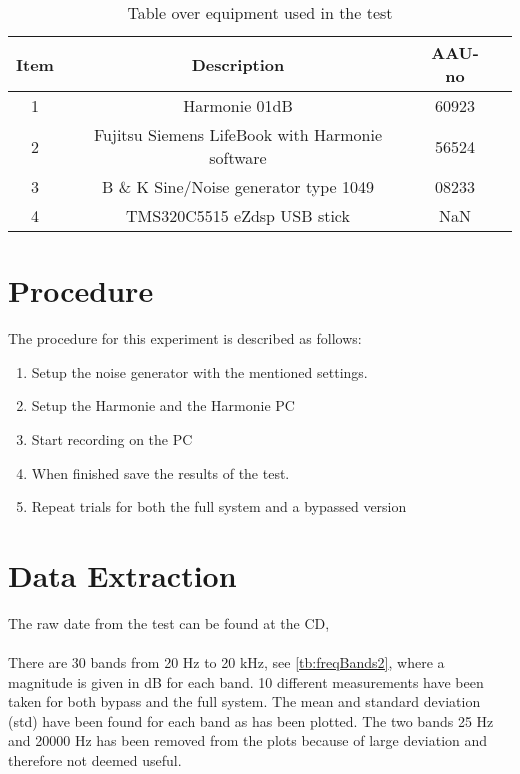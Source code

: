 \begin{table}[H]
\centering
{}
\begin{tabular}{S[table-format=1]ccc} \toprule
    {Item} & {Description} & {AAU-no} \\       &  Harmonie 01dB  & 60923  \\ 
    2      &  Fujitsu Siemens LifeBook with Harmonie software  & 56524  \\ 
    3      &  B \& K Sine/Noise generator type 1049  & 08233  \\ 
    4      &  TMS320C5515 eZdsp USB stick  & NaN  \\  \bottomrule 
\end{tabular}
\caption{Table over equipment used in the test}
\label{tab:UsedEquipmentFreqResponseActual}
\end{table}
\vspace{-5mm}


\section{Procedure}
The procedure for this experiment is described as follows:
\vspace{-5mm}
\begin{enumerate}
\item Setup the noise generator with the mentioned settings.
\item Setup the Harmonie and the Harmonie PC
\item Start recording on the PC
\item When finished save the results of the test.
\item Repeat trials for both the full system and a bypassed version
\end{enumerate}

\section{Data Extraction}
The raw date from the test can be found at the CD, \\ 
\\
There are 30 bands from 20 Hz to 20 kHz, see \autoref{tb:freqBands2}, where a magnitude is given in dB for each band. 10 different measurements have been taken for both bypass and the full system. The mean and standard deviation (std) have been found for each band as has been plotted. The two bands 25 Hz and 20000 Hz has been removed from the plots because of large deviation and therefore not deemed useful.

